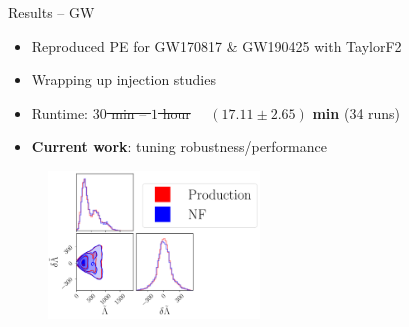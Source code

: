 \documentclass[usenames,dvipsnames,t]{beamer}
\newcommand{\incfig}[2][0.75\textwidth]{%
    \def\svgwidth{\columnwidth}
    \resizebox{#1}{!}{{#2.pdf_tex}}
}
\begin{document}
\begin{frame}{Results -- GW}
  \def\x{2mm}
  \def\y{-3mm}


  \begin{itemize}
    \item Reproduced PE for GW170817 \& GW190425 with TaylorF2
    
    \vspace{\x}

    \item Wrapping up injection studies
    
    \vspace{\x}

    \item Runtime: \st{$30$ min -- $1$ hour} \ \ $\mathbf{(17.11 \pm 2.65)}$ \textbf{min} (34 runs)
    

    
    \vspace{\x}

    \item \textbf{Current work}: tuning robustness/performance
  \end{itemize}

  \vspace{\y}

  \vspace{8mm}
  \begin{figure}[H]
    \centering
    \includegraphics[width = 0.50\textwidth]{Figures/presentation_GW170817_production_vs_NF.pdf}
  \end{figure}
\end{frame}
\end{document}
